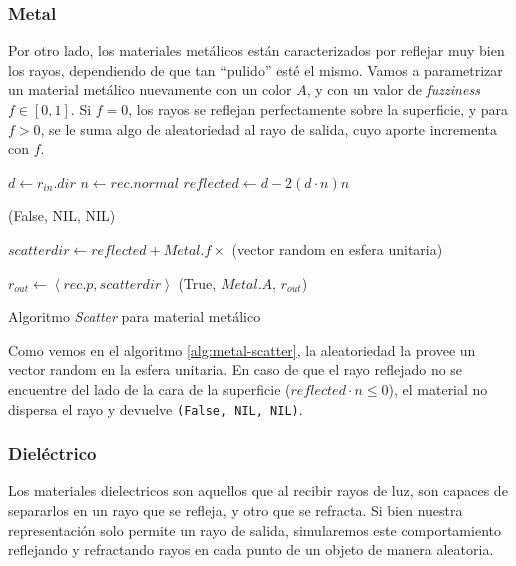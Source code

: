 \subsubsection{Metal}

Por otro lado, los materiales metálicos están caracterizados por reflejar muy
bien los rayos, dependiendo de que tan ``pulido'' esté el mismo. Vamos a
parametrizar un material metálico nuevamente con un color $A$, y con un valor de
\textit{fuzziness} $f \in [0, 1]$. Si $f=0$, los rayos se reflejan perfectamente
sobre la superficie, y para $f>0$, se le suma algo de aleatoriedad al rayo de
salida, cuyo aporte incrementa con $f$.

\begin{algorithm}[H]
\begin{algorithmic}[1]

    \State $d \gets r_{in}.dir$
    \State $n \gets rec.normal$
    \State $reflected \gets d - 2 (d \cdot n) n $

        \State \Return (False, NIL, NIL)
    \EndIf

    \State $scatterdir \gets reflected + Metal.f \times$ (vector random en esfera
    unitaria)

    \State $r_{out} \gets \left \langle rec.p, scatterdir \right \rangle$
    \State \Return (True, $Metal.A$, $r_{out}$)
\EndFunction
\end{algorithmic}
\caption{Algoritmo \textit{Scatter} para material metálico}
\label{alg:metal-scatter}
\end{algorithm}

Como vemos en el algoritmo \ref{alg:metal-scatter}, la aleatoriedad la provee un
vector random en la esfera unitaria. En caso de que el rayo reflejado no se
encuentre del lado de la cara de la superficie ($reflected \cdot n \le 0$), el
material no dispersa el rayo y devuelve \texttt{(False, NIL, NIL)}.

\subsubsection{Dieléctrico}

Los materiales dielectricos son aquellos que al recibir rayos de luz, son
capaces de separarlos en un rayo que se refleja, y otro que se refracta. Si bien
nuestra representación solo permite un rayo de salida, simularemos este
comportamiento reflejando y refractando rayos en cada punto de un objeto de
manera aleatoria.

